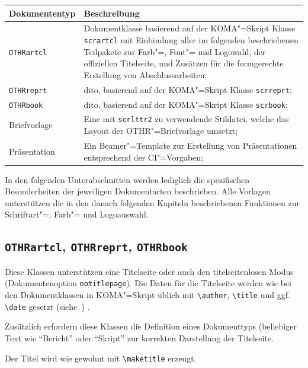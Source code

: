 \documentclass[
paper=a4,
DIV=11,
fontsize=12pt,
twoside=true,
parskip=half-,
department=FakS,
logostyle=flat
]{OTHRartcl}
\begin{document}
\begin{center}
\begin{tabularx}{.9\linewidth}{lX}\toprule
\textbf{Dokumententyp} & \textbf{Beschreibung} \\\midrule
\texttt{OTHRartcl} & Dokumentklasse basierend auf der KOMA"=Skript Klasse \texttt{scrartcl} mit Einbindung aller im folgenden beschriebenen Teilpakete zur Farb"=, Font"= und Logowahl, der offiziellen Titelseite, und Zusätzen für die formgerechte Erstellung von Abschlussarbeiten;\\
\texttt{OTHRreprt} & dito, basierend auf der KOMA"=Skript Klasse \texttt{scrreprt};\\
\texttt{OTHRbook} & dito, basierend auf der KOMA"=Skript Klasse \texttt{scrbook};\\
Briefvorlage & Eine mit \texttt{scrlttr2} zu verwendende Stildatei, welche das Layout der OTHR"=Briefvorlage umsetzt;\\
Präsentation & Ein Beamer"=Template zur Erstellung von Präsentationen entsprechend der CI"=Vorgaben;\\
\bottomrule
\end{tabularx}
\end{center}

In den folgenden Unterabschnitten werden lediglich die spezifischen Besonderheiten der jeweiligen Dokumentarten beschrieben.
Alle Vorlagen unterstützen die in den danach folgenden Kapiteln beschriebenen Funktionen zur Schriftart"=, Farb"= und Logoauswahl.

\subsection{\texttt{OTHRartcl}, \texttt{OTHRreprt}, \texttt{OTHRbook}}

Diese Klassen unterstützen eine Titelseite oder auch den titelseitenlosen Modus (Dokumentenoption \verb|notitlepage|).
Die Daten für die Titelseite werden wie bei den Dokumentklassen in KOMA"=Skript üblich mit \verb|\author|, \verb|\title| und ggf. \verb|\date| gesetzt (siehe~\cite{KOMA}) .

Zusätzlich erfordern diese Klassen die Definition eines Dokumenttyps (beliebiger Text wie \enquote{Bericht} oder \enquote{Skript} zur korrekten Darstellung der Titelseite.

Der Titel wird wie gewohnt mit \verb|\maketitle| erzeugt.
\end{document}
